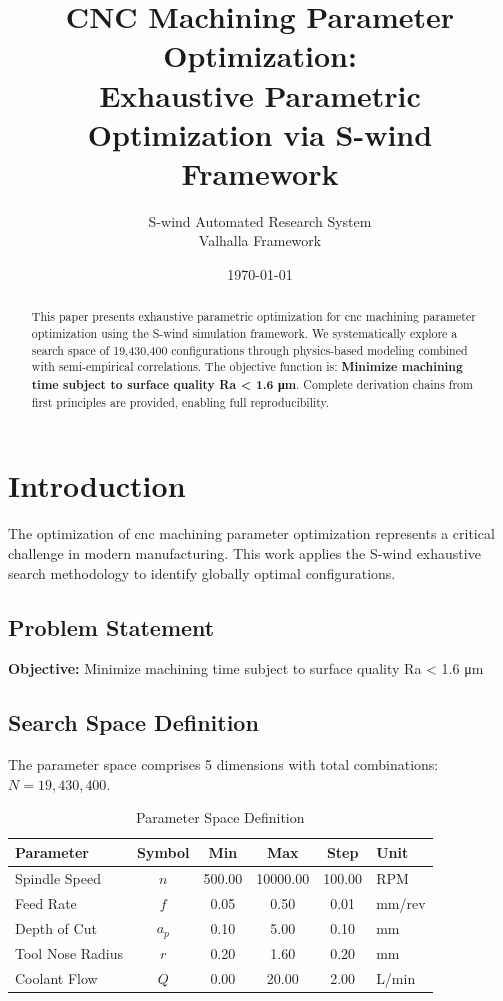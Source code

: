 \documentclass[11pt,twocolumn]{article}
\title{CNC Machining Parameter Optimization: \\Exhaustive Parametric Optimization via S-wind Framework}
\author{S-wind Automated Research System\\Valhalla Framework}
\date{\today}
\begin{document}
\maketitle

\begin{abstract}
This paper presents exhaustive parametric optimization for cnc machining parameter optimization using the S-wind simulation framework.
We systematically explore a search space of 19,430,400 configurations through physics-based modeling
combined with semi-empirical correlations. The objective function is: \textbf{Minimize machining time subject to surface quality Ra < 1.6 μm}.
Complete derivation chains from first principles are provided, enabling full reproducibility.
\end{abstract}

\section{Introduction}
The optimization of cnc machining parameter optimization represents a critical challenge in modern manufacturing.
This work applies the S-wind exhaustive search methodology to identify globally optimal configurations.

\subsection{Problem Statement}
\textbf{Objective:} Minimize machining time subject to surface quality Ra < 1.6 μm

\subsection{Search Space Definition}
The parameter space comprises 5 dimensions with total combinations: $N = 19,430,400$.

\begin{table}[h]
\centering
\caption{Parameter Space Definition}
\begin{tabular}{@{}lccccl@{}}
\toprule
Parameter & Symbol & Min & Max & Step & Unit \\
\midrule
Spindle Speed & $n$ & 500.00 & 10000.00 & 100.00 & RPM \\
Feed Rate & $f$ & 0.05 & 0.50 & 0.01 & mm/rev \\
Depth of Cut & $a_p$ & 0.10 & 5.00 & 0.10 & mm \\
Tool Nose Radius & $r$ & 0.20 & 1.60 & 0.20 & mm \\
Coolant Flow & $Q$ & 0.00 & 20.00 & 2.00 & L/min \\
\bottomrule
\end{tabular}
\end{table}
\end{document}
